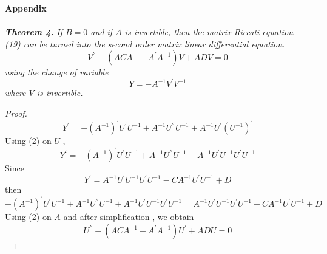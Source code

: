\documentclass[12pt]{article}
\newcommand*{\red}{\textcolor{red}}
\begin{document}
\begin{thebibliography}{99}



\end{thebibliography}
\vspace{14mm}

{\bf Appendix}\\
\\
\textit{{\bf Theorem 4.}
 If $B=0$ and if $A$ is invertible,  then the matrix Riccati equation (19) can be turned into the second order matrix linear differential equation. 
  \begin{equation}
      V^{''}-(ACA^{-}+A^{'}A^{-1})V+ADV=0
      \end{equation}
      using the change of variable 
      \begin{equation} Y=-A^{-1}V^{'}V^{-1}
      \end{equation}
    where $V$ is invertible.}

  \begin{proof}
     $$Y^{'}=-(A^{-1})^{'}U^{'}U^{-1}+A^{-1}U^{''}U^{-1}+A^{-1}U^{'}(U^{-1})^{'}$$
     Using  (2) on $U$ ,
    $$Y^{'}=-(A^{-1})^{'}U^{'}U^{-1}+A^{-1}U^{''}U^{-1}+A^{-1}U^{'}U^{-1}U^{'}U^{-1}$$ 
    Since $$Y^{'}=A^{-1}U^{'}U^{-1}U^{'}U^{-1}-CA^{-1}U^{'}U^{-1}+D$$
    then 
  $$ -(A^{-1})^{'}U^{'}U^{-1}+A^{-1}U^{''}U^{-1}+A^{-1}U^{'}U^{-1}U^{'}U^{-1}=
   A^{-1}U^{'}U^{-1}U^{'}U^{-1}-CA^{-1}U^{'}U^{-1}+D$$
   Using (2) on $A$ and after simplification , we obtain
   $$U^{''}-(ACA^{-1}+A^{'}A^{-1})U^{'}+ADU=0$$

\end{proof}  
 
\end{document}
